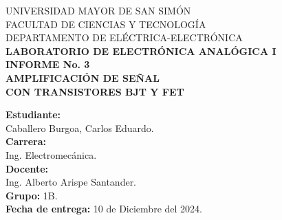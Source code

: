 \documentclass[letter,twoside,11pt]{report}
\newcommand{\blankpage}{
\newpage
\thispagestyle{empty}
\mbox{}
\newpage
}
\begin{document}
\begin{titlepage}
    \begin{center}
        {\Large UNIVERSIDAD MAYOR DE SAN SIMÓN}\\
        \vspace*{0.15cm}
        {\large FACULTAD DE CIENCIAS Y TECNOLOGÍA}\\
        \vspace*{0.10cm}
        DEPARTAMENTO DE ELÉCTRICA-ELECTRÓNICA\\
        \vspace*{3.0cm}
        {\Large \textbf{LABORATORIO DE ELECTRÓNICA ANALÓGICA I}}\\
        \vspace*{0.3cm}
        {\Large \textbf{INFORME No. 3}}\\
        \vspace*{3.5cm}
        {\Large \textbf{AMPLIFICACIÓN DE SEÑAL\\
        CON TRANSISTORES BJT Y FET}}\\
    \end{center}

    \vspace*{5.8cm}
    \leftskip=7.95cm
    \noindent
    \textbf{Estudiante:}\\
    Caballero Burgoa, Carlos Eduardo.\\
    \newline
    \textbf{Carrera:}\\
    Ing. Electromecánica.\\
    \newline
    \textbf{Docente:}\\
    Ing. Alberto Arispe Santander.\\
    \newline
    \textbf{Grupo:} 1B.\\
    \textbf{Fecha de entrega:} 10 de Diciembre del 2024.\\
\end{titlepage}
\addtocounter{page}{-1}

\blankpage
\addtocounter{page}{-1}

\tableofcontents
\newpage











\end{document}
